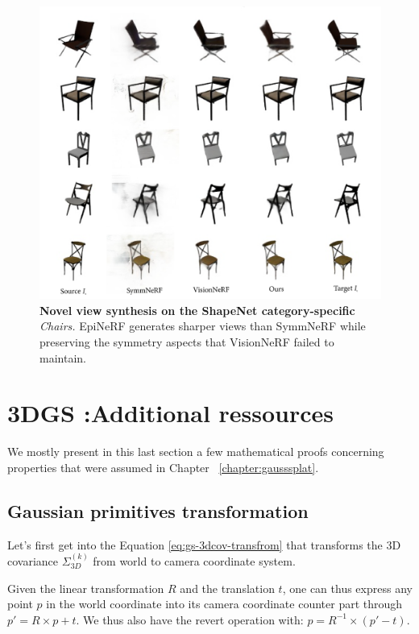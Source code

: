 \begin{figure}[htp!]
    \begin{center}
  \includegraphics[width=\linewidth]{images/epinerf/supp_Chairs_additional_inference.png}
  \caption{\textbf{Novel view synthesis on the ShapeNet category-specific} \textit{Chairs. }EpiNeRF generates sharper views than SymmNeRF while preserving the symmetry aspects that VisionNeRF failed to maintain.}
  \label{fig:supp_chairs}
  \end{center}
\end{figure}

\chapter{3DGS :Additional ressources}

We mostly present in this last section a few mathematical proofs concerning properties that were assumed in Chapter ~\ref{chapter:gausssplat}. 

\section{Gaussian primitives transformation}
\label{appendix:cov}
Let's first get into the Equation \ref{eq:gs-3dcov-transfrom} that transforms the 3D covariance $\Sigma^{(k)}_{3D}$ from world to camera coordinate system.

Given the linear transformation $R$ and the translation $t$, one can thus express any point $p$ in the world coordinate into its camera coordinate counter part through $p' = R\times p + t$. We thus also have the revert operation with: $p = R^{-1}\times (p' - t)$. 

